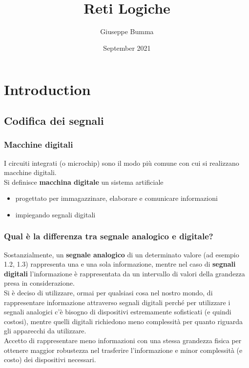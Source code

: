 \documentclass{article}
\title{Reti Logiche}
\author{Giuseppe Bumma}
\date{September 2021}
\begin{document}
\tableofcontents

\maketitle

\section{Introduction}
\subsection{Codifica dei segnali}
\subsubsection{Macchine digitali}
I circuiti integrati (o microchip) sono il modo più comune con cui si realizzano macchine digitali.
\vspace{0.2cm}\\
Si definisce \textbf{macchina digitale} un sistema artificiale
\begin{itemize}
    \item progettato per immagazzinare, elaborare e comunicare informazioni 
    \item impiegando segnali digitali
\end{itemize}
\subsubsection*{Qual è la differenza tra segnale analogico e digitale?}
Sostanzialmente, un \textbf{segnale analogico} di un determinato valore (ad esempio 1.2, 1.3) rappresenta una e una sola informazione, mentre nel caso di \textbf{segnali digitali} l'informazione è rappresentata da un intervallo di valori della grandezza presa in considerazione.
\vspace{0.2cm}\\
Si è deciso di utilizzare, ormai per qualsiasi cosa nel nostro mondo, di rappresentare informazione attraverso segnali digitali perché per utilizzare i segnali analogici c'è bisogno di dispositivi estremamente sofisticati (e quindi costosi), mentre quelli digitali richiedono meno complessità per quanto riguarda gli apparecchi da utilizzare.\\
Accetto di rappresentare meno informazioni con una stessa grandezza fisica per ottenere maggior robustezza nel trasferire l’informazione e minor complessità (e costo) dei dispositivi necessari.
\end{document}
